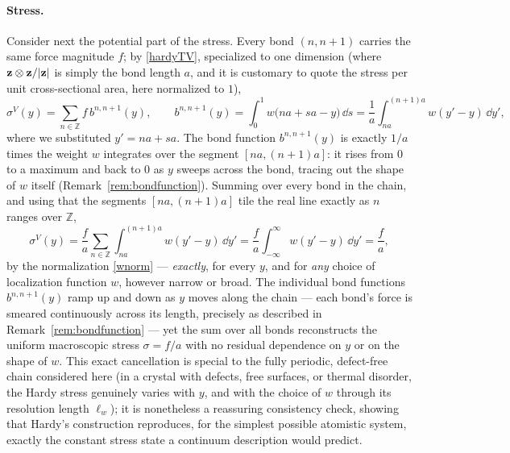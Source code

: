 \paragraph{Stress.} Consider next the potential part of the stress. Every bond $(n,n{+}1)$ carries the same force magnitude $f$; by \eqref{hardyTV}, specialized to one dimension (where $\mathbf{z}\otimes\mathbf{z}/|\mathbf{z}|$ is simply the bond length $a$, and it is customary to quote the stress per unit cross-sectional area, here normalized to $1$),
\begin{equation}
	\sigma^V(y) = \sum_{n\in\mathbb Z} f\,b^{n,n+1}(y), \qquad b^{n,n+1}(y) = \int_0^1 w\big(na+sa-y\big)\,\dd s = \frac1a\int_{na}^{(n+1)a} w(y'-y)\,\dd y',
\end{equation}
where we substituted $y'=na+sa$. The bond function $b^{n,n+1}(y)$ is exactly $1/a$ times the weight $w$ integrates over the segment $[na,(n+1)a]$: it rises from $0$ to a maximum and back to $0$ as $y$ sweeps across the bond, tracing out the shape of $w$ itself (Remark~\ref{rem:bondfunction}). Summing over every bond in the chain, and using that the segments $[na,(n+1)a]$ tile the real line exactly as $n$ ranges over $\mathbb Z$,
\begin{equation}
	\sigma^V(y) = \frac{f}{a}\sum_{n\in\mathbb Z}\int_{na}^{(n+1)a}w(y'-y)\,\dd y' = \frac{f}{a}\int_{-\infty}^\infty w(y'-y)\,\dd y' = \frac{f}{a},
\end{equation}
by the normalization \eqref{wnorm} --- \textit{exactly}, for every $y$, and for \textit{any} choice of localization function $w$, however narrow or broad. The individual bond functions $b^{n,n+1}(y)$ ramp up and down as $y$ moves along the chain --- each bond's force is smeared continuously across its length, precisely as described in Remark~\ref{rem:bondfunction} --- yet the sum over all bonds reconstructs the uniform macroscopic stress $\sigma=f/a$ with no residual dependence on $y$ or on the shape of $w$. This exact cancellation is special to the fully periodic, defect-free chain considered here (in a crystal with defects, free surfaces, or thermal disorder, the Hardy stress genuinely varies with $y$, and with the choice of $w$ through its resolution length $\ell_w$); it is nonetheless a reassuring consistency check, showing that Hardy's construction reproduces, for the simplest possible atomistic system, exactly the constant stress state a continuum description would predict.

